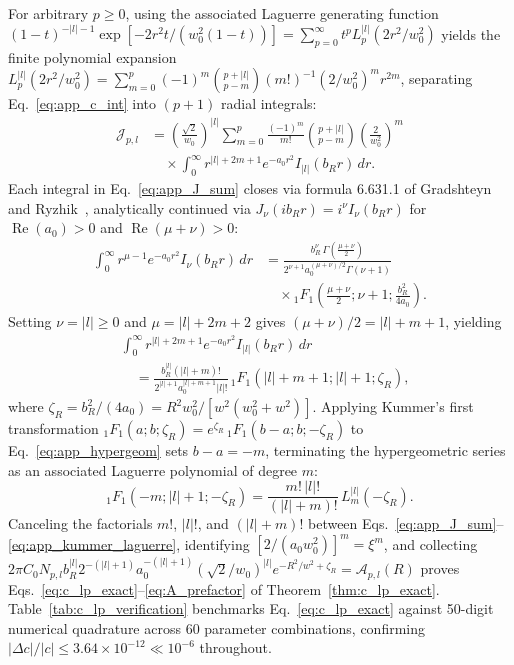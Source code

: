 \documentclass[aps,pra,onecolumn,notitlepage,11pt,tightenlines,nofootinbib,floatfix,longbibliography]{revtex4-2}
\theoremstyle{remark}
\newcommand{\abs}[1]{\lvert #1 \rvert}
\begin{document}
For arbitrary $p \ge 0$, using the associated Laguerre generating function $(1-t)^{-\abs{l}-1}\allowbreak \exp[-2r^2 t/(w_0^2(1-t))] = \sum_{p=0}^\infty t^p L_p^{\abs{l}}(2r^2/w_0^2)$ yields the finite polynomial expansion $L_p^{\abs{l}}(2r^2/w_0^2) = \sum_{m=0}^p (-1)^m \allowbreak \binom{p+\abs{l}}{p-m} \allowbreak (m!)^{-1} \allowbreak (2/w_0^2)^m r^{2m}$, separating Eq.~\eqref{eq:app_c_int} into $(p+1)$ radial integrals:
\begin{align}
\mathcal{J}_{p,l} &= \left(\frac{\sqrt{2}}{w_0}\right)^{\abs{l}} \sum_{m=0}^p \frac{(-1)^m}{m!}\binom{p+\abs{l}}{p-m}\left(\frac{2}{w_0^2}\right)^m \nonumber \\
&\quad \times \int_0^\infty r^{\abs{l}+2m+1} e^{-a_0 r^2} I_{\abs{l}}(b_R r)\,dr.
\label{eq:app_J_sum}
\end{align}
Each integral in Eq.~\eqref{eq:app_J_sum} closes via formula 6.631.1 of Gradshteyn and Ryzhik~\cite{Gradshteyn2014}, analytically continued via $J_\nu(i b_R r) = i^\nu I_\nu(b_R r)$ for $\operatorname{Re}(a_0) > 0$ and $\operatorname{Re}(\mu+\nu) > 0$:
\begin{align*}
\int_0^\infty r^{\mu-1} e^{-a_0 r^2} I_\nu(b_R r)\,dr &= \frac{b_R^\nu\,\Gamma\!\left(\frac{\mu+\nu}{2}\right)}{2^{\nu+1} a_0^{(\mu+\nu)/2}\Gamma(\nu+1)} \\
&\quad \times {_1F_1}\!\left(\frac{\mu+\nu}{2}; \nu+1; \frac{b_R^2}{4a_0}\right).
\end{align*}
Setting $\nu = \abs{l} \ge 0$ and $\mu = \abs{l} + 2m + 2$ gives $(\mu+\nu)/2 = \abs{l} + m + 1$, yielding
\begin{align}
&\int_0^\infty r^{\abs{l}+2m+1} e^{-a_0 r^2} I_{\abs{l}}(b_R r)\,dr \nonumber \\
&\quad = \frac{b_R^{\abs{l}}(\abs{l}+m)!}{2^{\abs{l}+1} a_0^{\abs{l}+m+1}\abs{l}!}\,{_1F_1}\!\left(\abs{l}+m+1; \abs{l}+1; \zeta_R\right),
\label{eq:app_hypergeom}
\end{align}
where $\zeta_R = b_R^2/(4a_0) = R^2 w_0^2/[w^2(w_0^2+w^2)]$. Applying Kummer's first transformation ${_1F_1}(a;b;\zeta_R) = e^{\zeta_R}\,{_1F_1}(b-a;b;-\zeta_R)$ to Eq.~\eqref{eq:app_hypergeom} sets $b - a = -m$, terminating the hypergeometric series as an associated Laguerre polynomial of degree $m$:
\begin{equation}
{_1F_1}\!\left(-m; \abs{l}+1; -\zeta_R\right) = \frac{m!\,\abs{l}!}{(\abs{l}+m)!}\,L_m^{\abs{l}}(-\zeta_R).
\label{eq:app_kummer_laguerre}
\end{equation}
Canceling the factorials $m!$, $\abs{l}!$, and $(\abs{l}+m)!$ between Eqs.~\eqref{eq:app_J_sum}--\eqref{eq:app_kummer_laguerre}, identifying $[2/(a_0 w_0^2)]^m = \xi^m$, and collecting $2\pi C_0 N_{p,l} b_R^{\abs{l}} 2^{-(\abs{l}+1)} a_0^{-(\abs{l}+1)} (\sqrt{2}/w_0)^{\abs{l}} e^{-R^2/w^2 + \zeta_R} = \mathcal{A}_{p,l}(R)$ proves Eqs.~\eqref{eq:c_lp_exact}--\eqref{eq:A_prefactor} of Theorem~\ref{thm:c_lp_exact}. Table~\ref{tab:c_lp_verification} benchmarks Eq.~\eqref{eq:c_lp_exact} against 50-digit numerical quadrature across 60 parameter combinations, confirming $\abs{\Delta c}/\abs{c} \le 3.64\times 10^{-12} \ll 10^{-6}$ throughout.
\end{document}
